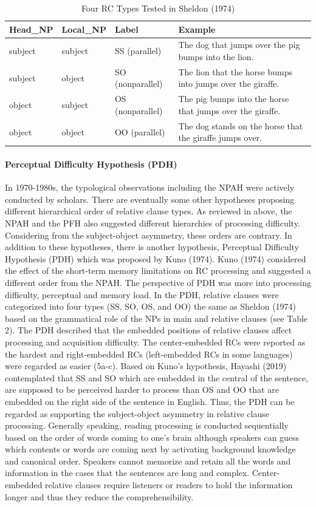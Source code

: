 \documentclass[
]{article}
\begin{document}
\begin{longtable}[t]{llll}
\caption{\label{tab:Table2_Sheldon}Four RC Types Tested in Sheldon (1974)}\\
\toprule
Head\_NP & Local\_NP & Label & Example\\
\midrule
subject & subject & SS (parallel) & The dog that jumps over the pig bumps into the lion.\\
subject & object & SO (nonparallel) & The lion that the horse bumps into jumps over the giraffe.\\
object & subject & OS (nonparallel) & The pig bumps into the horse that jumps over the giraffe.\\
object & object & OO (parallel) & The dog stands on the horse that the giraffe jumps over.\\
\bottomrule
\end{longtable}
\endgroup{}
\vspace{1em}

\paragraph{Perceptual Difficulty Hypothesis
(PDH)}\label{perceptual-difficulty-hypothesis-pdh}

In 1970-1980s, the typological observations including the NPAH were
actively conducted by scholars. There are eventually some other
hypotheses proposing different hierarchical order of relative clause
types. As reviewed in above, the NPAH and the PFH also suggested
different hierarchies of processing difficulty. Considering from the
subject-object asymmetry, these orders are contrary. In addition to
these hypotheses, there is another hypothesis, Perceptual Difficulty
Hypothesis (PDH) which was proposed by Kuno (1974). Kuno (1974)
considered the effect of the short-term memory limitations on RC
processing and suggested a different order from the NPAH. The
perspective of PDH was more into processing difficulty, perceptual and
memory load. In the PDH, relative clauses were categorized into four
types (SS, SO, OS, and OO) the same as Sheldon (1974) based on the
grammatical role of the NPs in main and relative clauses (see Table 2).
The PDH described that the embedded positions of relative clauses affect
processing and acquisition difficulty. The center-embedded RCs were
reported as the hardest and right-embedded RCs (left-embedded RCs in
some languages) were regarded as easier (5a-c). Based on Kuno's
hypothesis, Hayashi (2019) contemplated that SS and SO which are
embedded in the central of the sentence, are supposed to be perceived
harder to process than OS and OO that are embedded on the right side of
the sentence in English. Thus, the PDH can be regarded as supporting the
subject-object asymmetry in relative clause processing. Generally
speaking, reading processing is conducted sequentially based on the
order of words coming to one's brain although speakers can guess which
contents or words are coming next by activating background knowledge and
canonical order. Speakers cannot memorize and retain all the words and
information in the cases that the sentences are long and complex.
Center-embedded relative clauses require listeners or readers to hold
the information longer and thus they reduce the comprehensibility.
\end{document}
